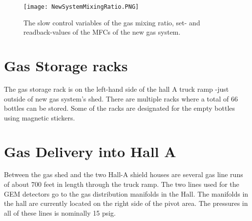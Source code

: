 \begin{figure}[h!]
\begin{center}
\texttt{[image: NewSystemMixingRatio.PNG]}
\caption{The slow control variables of the gas mixing ratio, set- and readback-values of the MFCs of the new gas system.}
\label{fig:NewSystemStripChart2}
\end{center}
\end{figure}

\section{Gas Storage racks}
The gas storage rack is on the left-hand side of the hall A truck ramp -just outside of new gas system's shed.
 There are multiple racks where a total of 66 bottles can be stored. Some of the racks are designated for the empty bottles using magnetic stickers.

\section{Gas Delivery into Hall A}
Between the gas shed and the two Hall-A shield houses are several gas
line runs of about 700 feet in length through the truck ramp.
The two lines used for the GEM detectors go to the gas distribution manifolds in the Hall. The manifolds in the hall are currently located on the right side of the pivot area. The pressures in all of these lines is nominally 15 psig.

